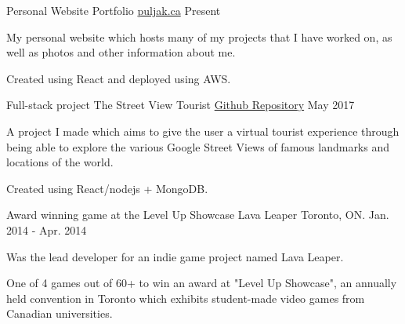 

\begin{cventries}

  \cventry
    {Personal Website} %
    {Portfolio} %
  {\href{https://puljak.ca}{puljak.ca}} %
    {Present} %
    {
      \begin{cvitems} %
        \item {My personal website which hosts many of my projects that I have worked on, as well as photos and other information about me.}
        \item {Created using React and deployed using AWS.}
      \end{cvitems}
    }

  \cventry
    {Full-stack project} %
    {The Street View Tourist} %
    {\href{https://github.com/ipuljak/street_view_tourist}{Github Repository}} %
    {May 2017} %
    {
      \begin{cvitems} %
        \item {A project I made which aims to give the user a virtual tourist experience through being able to explore the various Google Street Views of famous landmarks and locations of the world.}
        \item {Created using React/nodejs + MongoDB.}
      \end{cvitems}
    }

  \cventry
    {Award winning game at the Level Up Showcase} %
    {Lava Leaper} %
    {Toronto, ON.} %
    {Jan. 2014 - Apr. 2014} %
    {
      \begin{cvitems} %
        \item {Was the lead developer for an indie game project named Lava Leaper.}
        \item {One of 4 games out of 60+ to win an award at "Level Up Showcase", an annually held convention in Toronto which exhibits student-made video games from Canadian universities.}
      \end{cvitems}
    }

\end{cventries}
